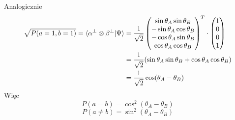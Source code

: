 

\begin{frame}{}
    Analogicznie
    \vspace{-3em}
    \begin{align*}
        \sqrt{P(a=1, b=1)}=\braket{\alpha^\perp \otimes \beta^\perp | \Psi}
        &=\frac{1}{\sqrt{2}}
        \begin{pmatrix}
        \sin \theta_A \sin \theta_B \\
        -\sin \theta_A \cos \theta_B \\
        -\cos \theta_A \sin \theta_B \\
        \cos \theta_A \cos \theta_B
        \end{pmatrix}^T \cdot
        \begin{pmatrix}
        1 \\
        0 \\
        0 \\
        1
        \end{pmatrix}
        \\
        &=\frac{1}{\sqrt{2}}(\sin \theta_A \sin \theta_B+\cos \theta_A \cos \theta_B)
        \\
        &=\frac{1}{\sqrt{2}}\cos(\theta_A-\theta_B)
\end{align*}
Więc
\[P(a=b)=\cos^2(\theta_A-\theta_B)\]
\[P(a\neq b)=\sin^2(\theta_A-\theta_B)\]
\end{frame}




